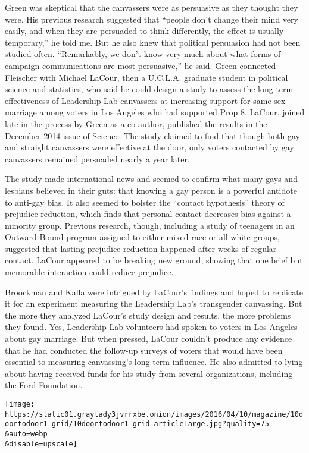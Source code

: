 Green was skeptical that the canvassers were as persuasive as they
thought they were. His previous research suggested that ``people don't
change their mind very easily, and when they are persuaded to think
differently, the effect is usually temporary,'' he told me. But he also
knew that political persuasion had not been studied often. ``Remarkably,
we don't know very much about what forms of campaign communications are
most persuasive,'' he said. Green connected Fleischer with Michael
LaCour, then a U.C.L.A. graduate student in political science and
statistics, who said he could design a study to assess the long-term
effectiveness of Leadership Lab canvassers at increasing support for
same-sex marriage among voters in Los Angeles who had supported Prop 8.
LaCour, joined late in the process by Green as a co-author, published
the results in the December 2014 issue of Science. The study claimed to
find that though both gay and straight canvassers were effective at the
door, only voters contacted by gay canvassers remained persuaded nearly
a year later.

The study made international news and seemed to confirm what many gays
and lesbians believed in their guts: that knowing a gay person is a
powerful antidote to anti-gay bias. It also seemed to bolster the
``contact hypothesis'' theory of prejudice reduction, which finds that
personal contact decreases bias against a minority group. Previous
research, though, including a study of teenagers in an Outward Bound
program assigned to either mixed-race or all-white groups, suggested
that lasting prejudice reduction happened after weeks of regular
contact. LaCour appeared to be breaking new ground, showing that one
brief but memorable interaction could reduce prejudice.

Broockman and Kalla were intrigued by LaCour's findings and hoped to
replicate it for an experiment measuring the Leadership Lab's
transgender canvassing. But the more they analyzed LaCour's study design
and results, the more problems they found. Yes, Leadership Lab
volunteers had spoken to voters in Los Angeles about gay marriage. But
when pressed, LaCour couldn't produce any evidence that he had conducted
the follow-up surveys of voters that would have been essential to
measuring canvassing's long-term influence. He also admitted to lying
about having received funds for his study from several organizations,
including the Ford Foundation.

\texttt{[image: https://static01.graylady3jvrrxbe.onion/images/2016/04/10/magazine/10doortodoor1-grid/10doortodoor1-grid-articleLarge.jpg?quality=75\\\&auto=webp\\\&disable=upscale]}

